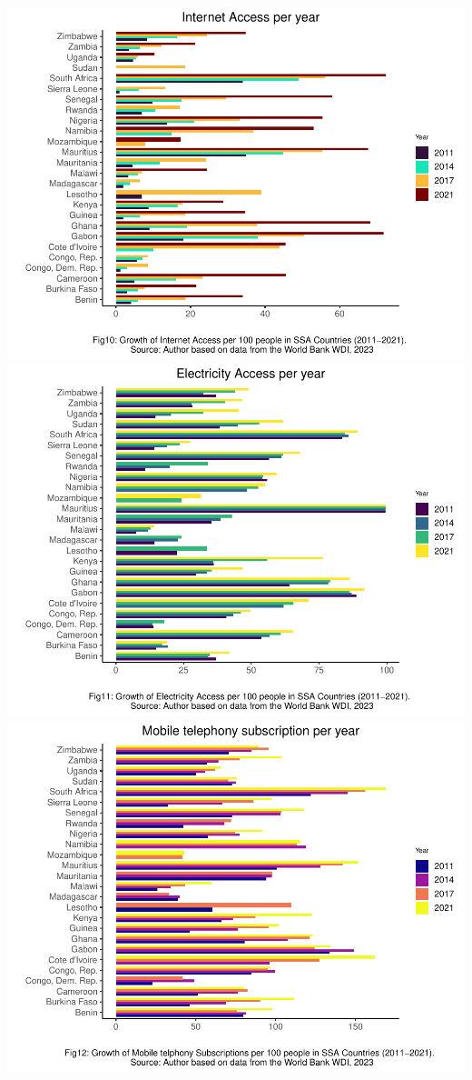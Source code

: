 \documentclass[preprint, 3p,
authoryear]{elsarticle} %
\begin{document}
\bigskip

\includegraphics{504.Project1_files/figure-latex/unnamed-chunk-6-1.pdf}
\includegraphics{504.Project1_files/figure-latex/unnamed-chunk-6-2.pdf}
\includegraphics{504.Project1_files/figure-latex/unnamed-chunk-6-3.pdf}
\end{document}
